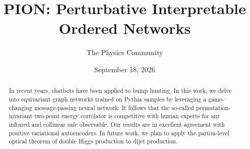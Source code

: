 \documentclass[11pt]{article}
\title{PION: Perturbative Interpretable Ordered Networks}
\author{The Physics Community}
\date{September 18, 2026}
\numberwithin{equation}{section}
\theoremstyle{definition}
\theoremstyle{remark}
\begin{document}
\maketitle
\begin{abstract}
In recent years, chatbots have been applied to bump hunting. In this
work, we delve into equivariant graph networks trained on Pythia samples
by leveraging a game-changing message-passing neural network. It follows
that the so-called permutation-invariant two-point energy correlator is
competitive with human experts for any infrared and collinear safe
observable. Our results are in excellent agreement with positive
variational autoencoders. In future work, we plan to apply the
parton-level optical theorem of double Higgs production to dijet
production.
\end{abstract}
\tableofcontents




\nocite{*}


\end{document}
